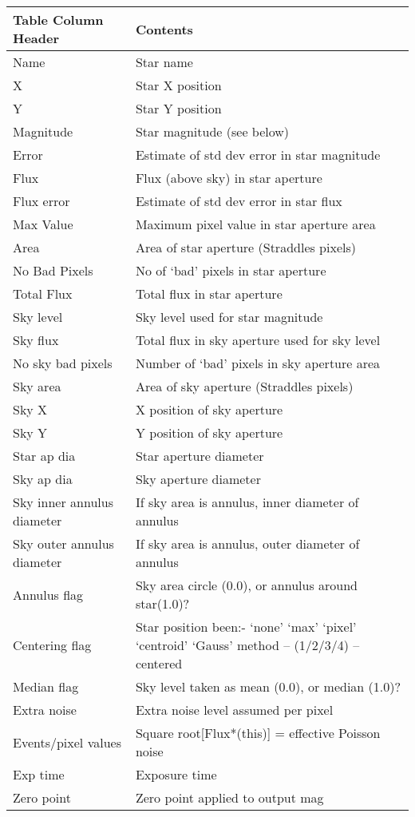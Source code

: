 \begin{small}
{{\begin{tabular}{|l|p{3in}|}\hline
   Table Column Header & Contents \\ \hline
   Name               &	Star name \\
   X 			& Star X position \\
   Y			& Star Y position \\
   Magnitude		& Star magnitude (see below) \\
   Error		& Estimate of std dev error in star magnitude \\
   Flux			& Flux (above sky) in star aperture \\
   Flux error		& Estimate of std dev error in star flux \\
   Max Value 		& Maximum pixel value in star aperture area \\
   Area 		& Area of star aperture (Straddles pixels) \\
   No Bad Pixels 	& No of `bad' pixels in star aperture \\
   Total Flux		& Total flux in star aperture \\
   Sky level 		& Sky level used for star magnitude \\
   Sky flux 		& Total flux in sky aperture used for sky level \\
   No sky bad pixels	& Number of `bad' pixels in sky aperture area \\
   Sky area 		& Area of sky aperture (Straddles pixels) \\
   Sky X 		& X position of sky aperture \\
   Sky Y  		& Y position of sky aperture \\
   Star ap dia 		& Star aperture diameter \\
   Sky ap dia 		& Sky aperture diameter \\
   Sky inner annulus diameter   & If sky area is annulus, inner diameter
                                  of annulus \\
   Sky outer annulus diameter  &  If sky area is annulus, outer diameter
                                  of annulus \\
   Annulus flag 	& Sky area circle (0.0), or annulus around
                          star(1.0)? \\
   Centering flag 	& Star position been:- `none' `max' `pixel'
                          `centroid' `Gauss' method -- (1/2/3/4) --
                           centered \\
   Median flag 		& Sky level taken as mean (0.0), or median (1.0)? \\
   Extra noise 		& Extra noise level assumed per pixel \\
   Events/pixel values 	& Square root[Flux*(this)] = effective Poisson
                          noise \\
   Exp time 		& Exposure time \\
   Zero point		& Zero point applied to output mag \\ \hline
\end{tabular}


}}
\end{small}
